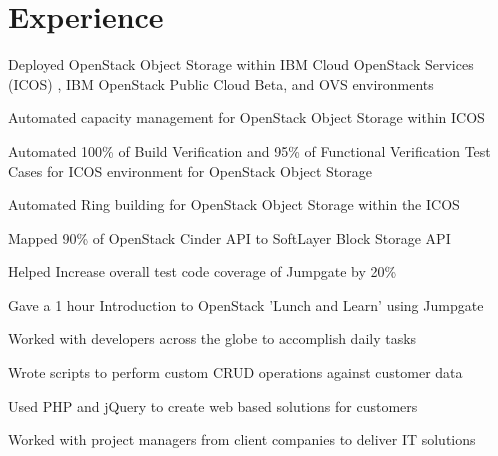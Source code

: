 \documentclass[letterpaper]{resume} %
\begin{document}
\begin{minipage}[t]{0.66\textwidth} %


\section{Experience}

\vspace{\topsep} %
\begin{tightitemize}
\item Deployed OpenStack Object Storage within IBM Cloud OpenStack Services (ICOS) , IBM OpenStack Public Cloud Beta, and OVS environments
\item Automated capacity management for OpenStack Object Storage within ICOS
\item Automated 100\% of Build Verification and 95\% of Functional Verification Test Cases for ICOS environment for OpenStack Object Storage
\item Automated Ring building for OpenStack Object Storage within the ICOS
\item Mapped 90\% of OpenStack Cinder API to SoftLayer Block Storage API
\item Helped Increase overall test code coverage of Jumpgate by 20\%
\item Gave a 1 hour Introduction to OpenStack ’Lunch and Learn’ using Jumpgate
\item Worked with developers across the globe to accomplish daily tasks
\end{tightitemize}

\sectionspace %



\begin{tightitemize}
\item Wrote scripts to perform custom CRUD operations against customer data
\item Used PHP and jQuery to create web based solutions for customers
\item Worked with project managers from client companies to deliver IT solutions
\end{tightitemize}


\end{minipage}
\end{document}
